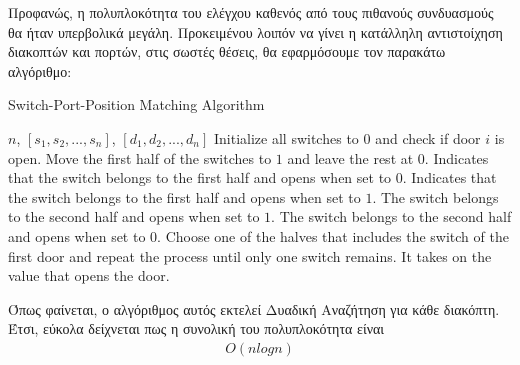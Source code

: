 \documentclass{article}
\begin{document}
\begin{center}
\end{center}
Προφανώς, η πολυπλοκότητα του ελέγχου καθενός από τους πιθανούς συνδυασμούς θα ήταν υπερβολικά μεγάλη. Προκειμένου λοιπόν να γίνει η κατάλληλη αντιστοίχηση διακοπτών και πορτών, στις σωστές θέσεις, θα εφαρμόσουμε τον παρακάτω αλγόριθμο:
\begin{algorithm}[H]
\caption{Switch-Port-Position Matching Algorithm}
\begin{algorithmic}[1]
\Require $n$, ${[s_1, s_2, ..., s_n]}$, ${[d_1, d_2, ..., d_n]}$
    \State Initialize all switches to $0$ and check if door $i$ is open.
    \State Move the first half of the switches to $1$ and leave the rest at $0$.
        \State Indicates that the switch belongs to the first half and opens when set to $0$.
        \State Indicates that the switch belongs to the first half and opens when set to $1$.
        \State The switch belongs to the second half and opens when set to $1$.
        \State The switch belongs to the second half and opens when set to $0$.
    \EndIf
\EndFor
\State Choose one of the halves that includes the switch of the first door and repeat the process until only one switch remains. It takes on the value that opens the door.
\end{algorithmic}
\end{algorithm}

Όπως φαίνεται, ο αλγόριθμος αυτός εκτελεί Δυαδική Αναζήτηση για κάθε διακόπτη. Έτσι, εύκολα δείχνεται πως η συνολική του πολυπλοκότητα είναι 
\begin{align}
O(nlogn)
\end{align}
\end{document}
